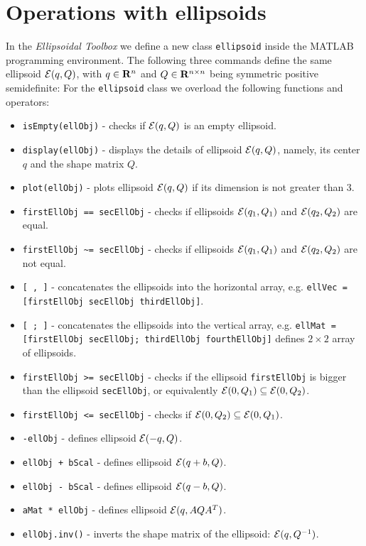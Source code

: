 \section{Operations with ellipsoids}
In the {\it Ellipsoidal Toolbox} we define a new class {\tt ellipsoid} inside
the MATLAB programming environment. The following three commands
define the same ellipsoid $\EE(q,Q)$, with $q\in{\bf R}^n$ and
$Q\in{\bf R}^{n\times n}$ being symmetric positive semidefinite:
For the {\tt ellipsoid} class we overload the following functions and operators:
\begin{itemize}
\item {\tt isEmpty(ellObj)} - checks if $\EE(q,Q)$ is an empty ellipsoid.
\item {\tt display(ellObj)} - displays the details of ellipsoid $\EE(q,Q)$, namely,
its center $q$ and the shape matrix $Q$.
\item {\tt plot(ellObj)} - plots ellipsoid $\EE(q,Q)$ if its dimension is not greater
than 3.
\item {\tt firstEllObj == secEllObj} - checks if ellipsoids $\EE(q_1,Q_1)$ and
$\EE(q_2,Q_2)$ are equal.
\item {\tt firstEllObj \~{ }= secEllObj} - checks if ellipsoids $\EE(q_1,Q_1)$ and
$\EE(q_2,Q_2)$ are not equal.
\item {\tt [ , ]} - concatenates the ellipsoids into the horizontal array, e.g.
{\tt ellVec = [firstEllObj secEllObj thirdEllObj]}.
\item {\tt [ ; ]} - concatenates the ellipsoids into the vertical array, e.g.
{\tt ellMat = [firstEllObj secEllObj; thirdEllObj fourthEllObj]} defines $2\times 2$ array of ellipsoids.
\item {\tt firstEllObj >= secEllObj} - checks if the ellipsoid {\tt firstEllObj} is bigger than
the ellipsoid {\tt secEllObj}, or equivalently $\EE(0,Q_1)\subseteq\EE(0,Q_2)$.
\item {\tt firstEllObj <= secEllObj} - checks if $\EE(0,Q_2)\subseteq\EE(0,Q_1)$.
\item {\tt -ellObj} - defines ellipsoid $\EE(-q,Q)$.
\item {\tt ellObj + bScal} - defines ellipsoid $\EE(q+b,Q)$.
\item {\tt ellObj - bScal} - defines ellipsoid $\EE(q-b,Q)$.
\item {\tt aMat * ellObj} - defines ellipsoid $\EE(q,AQA^T)$.
\item {\tt ellObj.inv()} - inverts the shape matrix of the ellipsoid: $\EE(q,Q^{-1})$.
\end{itemize}
